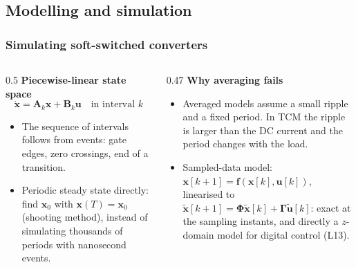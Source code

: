 \subsection{Modelling and simulation}

\begin{frame}
	\frametitle{Simulating soft-switched converters}
	\begin{columns}[T]
		\begin{column}{0.5\textwidth}
			\small
			\textbf{Piecewise-linear state space}
			\begin{equation*}
				\dot{\mathbf{x}}=\mathbf{A}_k\mathbf{x}+\mathbf{B}_k\mathbf{u}\quad\text{in interval }k
			\end{equation*}
			\begin{itemize}
				\item The sequence of intervals follows from events: gate edges, zero crossings, end of a transition.
				\item Periodic steady state directly: find $\mathbf{x}_0$ with $\mathbf{x}(T)=\mathbf{x}_0$ (shooting method), instead of simulating thousands of periods with nanosecond events.
			\end{itemize}
		\end{column}
		\begin{column}{0.47\textwidth}
			\small
			\textbf{Why averaging fails}
			\begin{itemize}
				\item Averaged models assume a small ripple and a fixed period. In TCM the ripple is larger than the DC current and the period changes with the load.
				\item Sampled-data model: $\mathbf{x}[k+1]=\mathbf{f}(\mathbf{x}[k],\mathbf{u}[k])$, linearised to $\tilde{\mathbf{x}}[k+1]=\boldsymbol{\Phi}\tilde{\mathbf{x}}[k]+\boldsymbol{\Gamma}\tilde{\mathbf{u}}[k]$: exact at the sampling instants, and directly a $z$-domain model for digital control (L13).
			\end{itemize}
		\end{column}
	\end{columns}
\end{frame}

